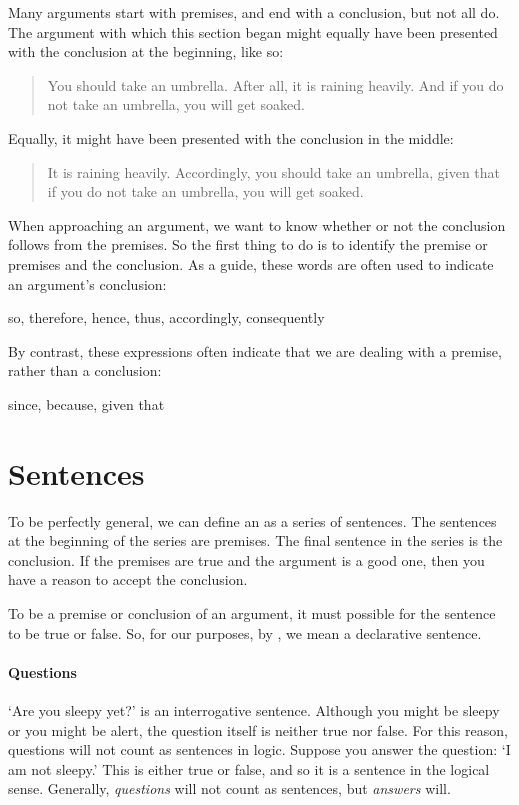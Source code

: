 Many arguments start with premises, and end with a conclusion, but not all do. The argument with which this section began might equally have been presented with the conclusion at the beginning, like so:
	\begin{quote}
		You should take an umbrella. After all, it is raining heavily. And if you do not take an umbrella, you will get soaked. 
	\end{quote}
Equally, it might have been presented with the conclusion in the middle:
	\begin{quote}
		It is raining heavily. Accordingly, you should take an umbrella, given that if you do not take an umbrella, you will get soaked.
	\end{quote}
When approaching an argument, we want to know whether or not the conclusion follows from the premises. So the first thing to do is to identify the premise or premises and the conclusion. As a guide, these words are often used to indicate an argument's conclusion:
	\begin{center}
		so, therefore, hence, thus, accordingly, consequently
	\end{center}
By contrast, these expressions often indicate that we are dealing with a premise, rather than a conclusion:
	\begin{center}
		since, because, given that
	\end{center}


\section{Sentences}
\label{intro.sentences}

To be perfectly general, we can define an  as a series of sentences. The sentences at the beginning of the series are premises. The final sentence in the series is the conclusion. If the premises are true and the argument is a good one, then you have a reason to accept the conclusion.

To be a premise or conclusion of an argument, it must possible for the sentence to be true or false. So, for our purposes, by , we mean a declarative sentence.

\paragraph{Questions} `Are you sleepy yet?' is an interrogative sentence. Although you might be sleepy or you might be alert, the question itself is neither true nor false. For this reason, questions will not count as sentences in logic. Suppose you answer the question: `I am not sleepy.' This is either true or false, and so it is a sentence in the logical sense. Generally, \emph{questions} will not count as sentences, but \emph{answers} will. 

